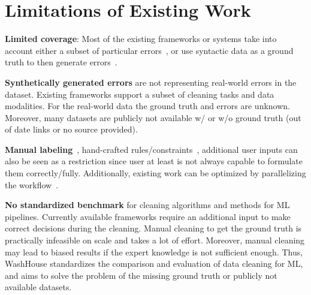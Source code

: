\newpage

\section{Limitations of Existing Work}
\label{sec:limitations_of_existing_work}

\textbf{Limited coverage}: Most of the existing frameworks or systems take into account either a subset of particular errors~\cite{boostclean, raha, baran, jenga}, or use syntactic data as a ground truth to then generate errors~\cite{RestatGCS2022, bart}.

\textbf{Synthetically generated errors} are not representing real-world errors in the dataset. Existing frameworks support a subset of cleaning tasks and data modalities.
For the real-world data the ground truth and errors are unknown. Moreover, many datasets are publicly not available w/ or w/o ground truth (out of date links or no source provided).

\textbf{Manual labeling}~\cite{raha, baran}, hand-crafted rules/constraints~\cite{bart, RestatGCS2022}, additional user inputs can also be seen as a restriction 
since user at least is not always capable to formulate them correctly/fully. %
Additionally, existing work can be optimized by parallelizing the workflow~\cite{raha, baran, RekatsinasCIR2017, holodetect, RestatGCS2022, jenga}.

\textbf{No standardized benchmark} for cleaning algorithms and methods for ML pipelines. 
Currently available frameworks require an additional input to make correct decisions during the cleaning. Manual cleaning to get the ground truth is practically infeasible on scale and takes a lot of effort.
Moreover, manual cleaning may lead to biased results if the expert knowledge is not sufficient enough.
Thus, WashHouse standardizes the comparison and evaluation of data cleaning for ML, and aims to solve the problem of the missing ground truth or publicly not available datasets.
